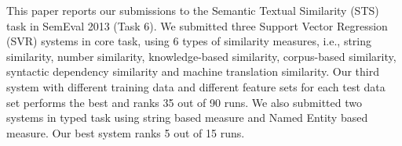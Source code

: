 This paper reports our submissions to the Semantic Textual Similarity (STS) task in SemEval 2013 (Task 6). We submitted three Support Vector Regression
 (SVR) systems in core task, using 6 types of similarity measures, i.e., string
 similarity, number similarity, knowledge-based similarity, corpus-based
 similarity, syntactic dependency similarity and machine translation similarity.
 Our third system with different training data and different feature sets for
 each test data set performs the best and ranks 35 out of 90 runs. We also
 submitted two systems in typed task using string based measure and Named Entity
 based measure. Our best system ranks 5 out of 15 runs.

